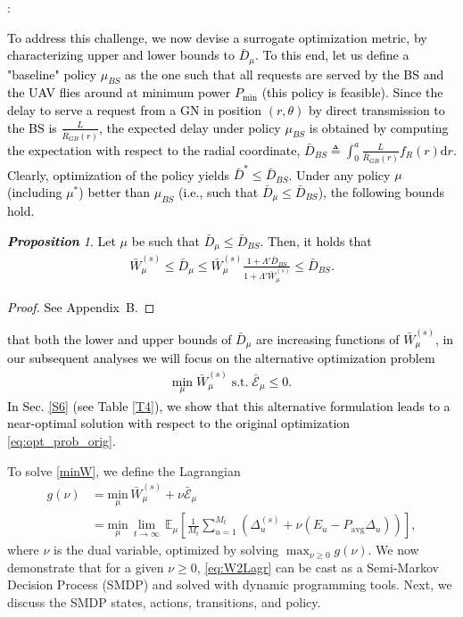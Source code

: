 \documentclass[10pt, twocolumn]{IEEEtran}
\theoremstyle{plain}
\theoremstyle{definition}
\theoremstyle{remark}
\newtheorem{prop}{\textbf{Proposition}}
\newcommand\hlt[1]{\textcolor{black}{#1}}
\begin{document}
\noindent{\textbf{\hlt{Alternative Problem Formulation}}}:\label{altopt} \hlt{
To address this challenge, we now devise a surrogate optimization metric, by characterizing upper and lower bounds to $\bar D_{\mu}$. To this end, let us define a "baseline" policy $\mu_{BS}$ as the one such that all requests are served by the BS and the UAV flies around at minimum power $P_{\min}$ (this policy is feasible). Since the delay to serve a request from a GN in position $(r,\theta)$ by direct transmission to the BS is $\frac{L}{\bar R_{GB}(r)}$,  the expected delay under policy $\mu_{BS}$ is obtained by computing the expectation with respect to the radial coordinate, $\bar{D}_{BS}{\triangleq}\int_{0}^{a}\frac{L}{\bar{R}_{GB}(r)}f_{R}(r)\mathrm{d}r$. Clearly, optimization of the policy yields $\bar{D}^{*}{\leq}\bar{D}_{BS}$. Under any policy $\mu$ (including $\mu^*$) better than 
$\mu_{BS}$ (i.e., such that $\bar{D}_{\mu}\leq\bar{D}_{BS}$), the following bounds hold.
\begin{prop}\label{P2}
    Let $\mu$ be such that $\bar{D}_{\mu}\leq\bar{D}_{BS}$. Then, it holds that
    \begin{align}\label{bounds}
        \bar{W}_{\mu}^{(s)} \leq \bar{D}_{\mu} \leq \bar{W}_{\mu}^{(s)} \frac{1 + \Lambda' \bar{D}_{BS}}{1 + \Lambda' \bar{W}_{\mu}^{(s)}} \leq \bar{D}_{BS}.
    \end{align}
\end{prop}
\begin{proof}
    See Appendix~B.
\end{proof}
\noindent{Noticing} that both the lower and upper bounds of $\bar{D}_{\mu}$ are increasing functions of $\bar{W}_{\mu}^{(s)}$, in our subsequent analyses we will focus on the alternative  optimization problem
\begin{align}
\label{minW}
   \underset{\mu}{\mathrm{min}} \; \bar{W}_{\mu}^{(s)} \; \mathrm{ s.t. } \; \bar{\mathcal E}_{\mu} \leq 0.
\end{align}
In Sec. \ref{S6} (see Table \ref{T4}), we show that this alternative formulation leads to a near-optimal solution with respect to the original optimization \eqref{eq:opt_prob_orig}.}
To solve \eqref{minW}, we define the Lagrangian
\begin{align}\label{eq:W2Lagr}
    g(\nu) &= \underset{\mu}{\mathrm{min}}\, \bar{W}_{\mu}^{(s)} + \nu\bar{\mathcal E}_{\mu} \\&= \underset{\mu}{\mathrm{min}}\, \lim_{t\rightarrow\infty} \, \mathbb{E}_{\mu} \left[\frac{1}{M_t} \sum_{u=1}^{M_t}\left(\Delta_u^{(s)} + \nu (E_u{-}P_{\mathrm{avg}}\Delta_u)\right)\right],
\end{align}
where $\nu$ is the dual variable, optimized by solving $\max_{\nu{\geq}0}g(\nu)$. We now demonstrate that for a given $\nu{\geq}0$, \eqref{eq:W2Lagr} can be cast as a Semi-Markov Decision Process (SMDP) and solved with dynamic programming tools. Next, we discuss the SMDP states, actions, transitions, and policy. 
\end{document}
